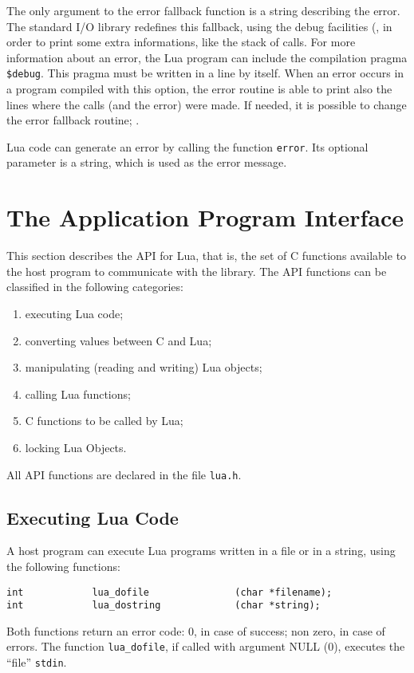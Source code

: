 The only argument to the error fallback function is a string describing
the error.
The standard I/O library redefines this fallback,
using the debug facilities (,
in order to print some extra informations,
like the stack of calls.
For more information about an error,
the Lua program can include the compilation pragma \verb'$debug'.
\label{pragma}
This pragma must be written in a line by itself.
When an error occurs in a program compiled with this option,
the error routine is able to print also the lines where the calls
(and the error) were made.
If needed, it is possible to change the error fallback routine;
.

Lua code can generate an error by calling the function \verb'error'.
Its optional parameter is a string,
which is used as the error message.


\section{The Application Program Interface}

This section describes the API for Lua, that is,
the set of C functions available to the host program to communicate
with the library.
The API functions can be classified in the following categories:
\begin{enumerate}
\item executing Lua code;
\item converting values between C and Lua;
\item manipulating (reading and writing) Lua objects;
\item calling Lua functions;
\item C functions to be called by Lua;
\item locking Lua Objects.
\end{enumerate}
All API functions are declared in the file \verb'lua.h'.

\subsection{Executing Lua Code}
A host program can execute Lua programs written in a file or in a string,
using the following functions:
\begin{verbatim}
int            lua_dofile               (char *filename);
int            lua_dostring             (char *string);
\end{verbatim}
Both functions return an error code:
0, in case of success; non zero, in case of errors.
The function \verb'lua_dofile', if called with argument NULL (0),
executes the ``file'' {\tt stdin}.

